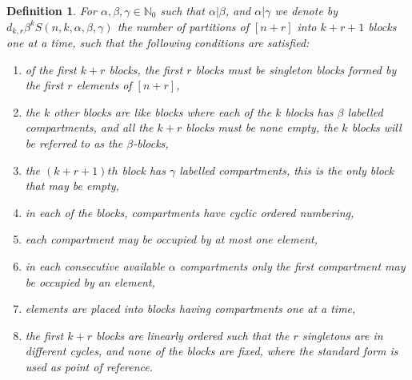 \documentclass[12pt]{amsart}
\newtheorem{proof 1}{proof 1}
\newtheorem{definition}{Definition}[section]
\begin{document}
\begin{definition}\label{definition:11}For $\alpha,\beta,\gamma\in\mathbb{N}_0$ such that $\alpha|\beta$, and $\alpha|\gamma$ we denote by $d_{k,r}\beta^{k} S(n,k,\alpha,\beta,\gamma)$	the number of partitions of $[n+r]$ into $k+r+1$ blocks one at a time, such that the following conditions are satisfied:
\begin{enumerate}
	\item of the first $k+r$ blocks, the first $r$ blocks must be singleton blocks formed by the first $r$ elements of $[n+r]$, 
	
	\item the $k$ other blocks are like blocks where each of the $k$ blocks has $\beta$ labelled compartments, and all the $k+r$ blocks must be none empty, the $k$ blocks will be referred to as the $\beta$-blocks,
	
\item the $(k+r+1)th$ block has $\gamma$ labelled compartments, this is the only block that may be empty,
	
	\item  in each of the blocks, compartments have cyclic ordered numbering,
	\item each compartment may be occupied by at most one element,
	\item in each consecutive available $\alpha$ compartments only the first compartment may be occupied by an element,
		\item elements are placed into blocks having compartments one at a time,
	\item the first $k+r$ blocks are linearly ordered such that the $r$ singletons are in different cycles, and none of the blocks are fixed, where the standard form is used as point of reference.
\end{enumerate}
\end{definition}
\end{document}

